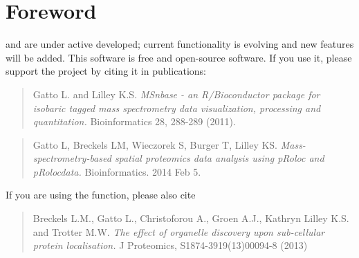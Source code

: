 \section*{Foreword}


 and  are under active developed; 
current functionality is evolving and new features will be added. 
This software is free and open-source software. 
If you use it, please support the project by citing it in publications:

\begin{quote}
  Gatto L. and Lilley K.S. \emph{MSnbase - an R/Bioconductor package
    for isobaric tagged mass spectrometry data visualization,
    processing and quantitation.} Bioinformatics 28, 288-289 (2011).
\end{quote}

\begin{quote}
  Gatto L, Breckels LM, Wieczorek S, Burger T, Lilley KS.
  \textit{Mass-spectrometry-based spatial proteomics data analysis
    using pRoloc and pRolocdata.} Bioinformatics. 2014 Feb 5.
\end{quote}

If you are using the  function, please also cite

\begin{quote}
  Breckels L.M., Gatto L., Christoforou A., Groen A.J., Kathryn Lilley
  K.S. and Trotter M.W.  \emph{The effect of organelle discovery upon
    sub-cellular protein localisation.}  J Proteomics,
  S1874-3919(13)00094-8 (2013)
\end{quote}

